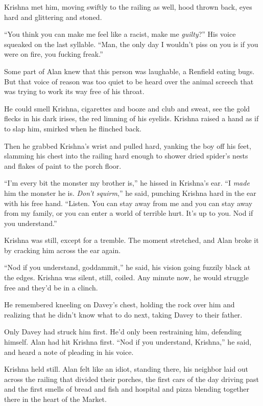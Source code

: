 Krishna met him, moving swiftly to the railing as well, hood thrown
back, eyes hard and glittering and stoned.

``You think you can make me feel like a racist, make me
\textit{guilty}?'' His voice squeaked on the last syllable.  ``Man,
the only day I wouldn't piss on you is if you were on fire, you
fucking freak.''

Some part of Alan knew that this person was laughable, a Renfield
eating bugs.  But that voice of reason was too quiet to be heard over
the animal screech that was trying to work its way free of his throat.

He could smell Krishna, cigarettes and booze and club and sweat, see
the gold flecks in his dark irises, the red limning of his eyelids. 
Krishna raised a hand as if to slap him, smirked when he flinched
back.

Then he grabbed Krishna's wrist and pulled hard, yanking the boy off
his feet, slamming his chest into the railing hard enough to shower
dried spider's nests and flakes of paint to the porch floor.

``I'm every bit the monster my brother is,'' he hissed in Krishna's
ear.  ``I \textit{made} him the monster he is.  \textit{Don't
squirm},'' he said, punching Krishna hard in the ear with his free
hand.  ``Listen.  You can stay away from me and you can stay away from
my family, or you can enter a world of terrible hurt.  It's up to you. 
Nod if you understand.''

Krishna was still, except for a tremble.  The moment stretched, and
Alan broke it by cracking him across the ear again.

``Nod if you understand, goddammit,'' he said, his vision going
fuzzily black at the edges.  Krishna was silent, still, coiled.  Any
minute now, he would struggle free and they'd be in a clinch.

He remembered kneeling on Davey's chest, holding the rock over him and
realizing that he didn't know what to do next, taking Davey to their
father.

Only Davey had struck him first.  He'd only been restraining him,
defending himself.  Alan had hit Krishna first.  ``Nod if you
understand, Krishna,'' he said, and heard a note of pleading in his
voice.

Krishna held still.  Alan felt like an idiot, standing there, his
neighbor laid out across the railing that divided their porches, the
first cars of the day driving past and the first smells of bread and
fish and hospital and pizza blending together there in the heart of
the Market.

